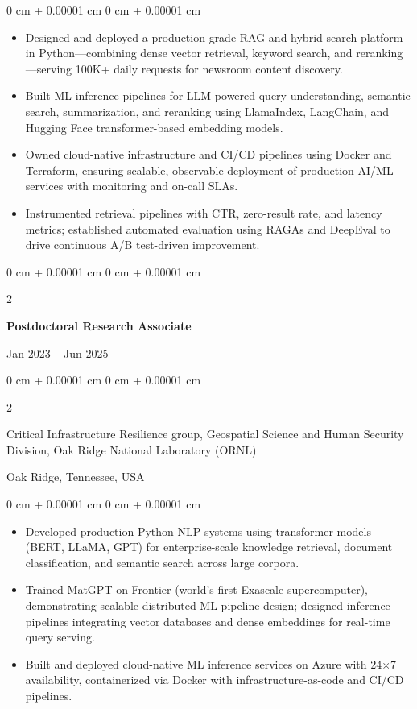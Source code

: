 \documentclass[10pt, letterpaper]{article}
\newenvironment{highlights}{
    \begin{itemize}[
        topsep=0.10 cm,
        parsep=0.10 cm,
        partopsep=0pt,
        itemsep=0pt,
        leftmargin=0 cm + 10pt
    ]
}{
    \end{itemize}
} %
\newenvironment{onecolentry}{
    \begin{adjustwidth}{
        0 cm + 0.00001 cm
    }{
        0 cm + 0.00001 cm
    }
}{
    \end{adjustwidth}
} %
\newenvironment{twocolentry}[2][]{
    \onecolentry
    \def\secondColumn{#2}
    \setcolumnwidth{\fill, 4.5 cm}
    \begin{paracol}{2}
}{
    \switchcolumn \raggedleft \secondColumn
    \end{paracol}
    \endonecolentry
} %
\begin{document}
    \begin{onecolentry}
        \begin{highlights}
            \item Designed and deployed a production-grade RAG and hybrid search platform in Python—combining dense vector retrieval, keyword search, and reranking—serving 100K+ daily requests for newsroom content discovery.
            \item Built ML inference pipelines for LLM-powered query understanding, semantic search, summarization, and reranking using LlamaIndex, LangChain, and Hugging Face transformer-based embedding models.
            \item Owned cloud-native infrastructure and CI/CD pipelines using Docker and Terraform, ensuring scalable, observable deployment of production AI/ML services with monitoring and on-call SLAs.
            \item Instrumented retrieval pipelines with CTR, zero-result rate, and latency metrics; established automated evaluation using RAGAs and DeepEval to drive continuous A/B test-driven improvement.
        \end{highlights}
    \end{onecolentry}

\vspace{1mm}
    
    \begin{twocolentry}{Jan 2023 -- Jun 2025}
        \textbf{Postdoctoral Research Associate}
    \end{twocolentry}
    \begin{twocolentry}{Oak Ridge, Tennessee, USA}
        Critical Infrastructure Resilience group, Geospatial Science and Human Security Division, Oak Ridge National Laboratory (ORNL)
    \end{twocolentry}
    \vspace{0.10 cm}
    \begin{onecolentry}
        \begin{highlights}
            \item Developed production Python NLP systems using transformer models (BERT, LLaMA, GPT) for enterprise-scale knowledge retrieval, document classification, and semantic search across large corpora.
            \item Trained MatGPT on Frontier (world’s first Exascale supercomputer), demonstrating scalable distributed ML pipeline design; designed inference pipelines integrating vector databases and dense embeddings for real-time query serving.
            \item Built and deployed cloud-native ML inference services on Azure with 24×7 availability, containerized via Docker with infrastructure-as-code and CI/CD pipelines.
        \end{highlights}
    \end{onecolentry}
\end{document}
